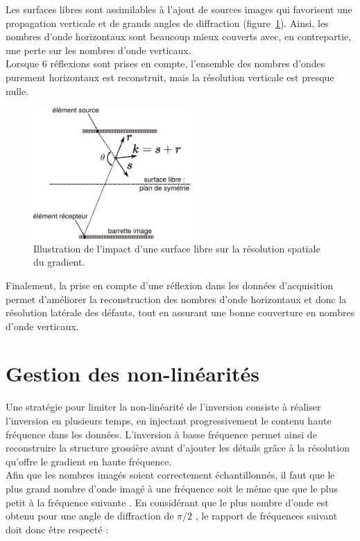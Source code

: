 Les surfaces libres sont assimilables à l'ajout de sources images qui favorisent une propagation verticale et de grands angles de diffraction (figure~\ref{app:reso_surf_libre}). Ainsi, les nombres d'onde horizontaux sont beaucoup mieux couverts avec, en contrepartie, une perte sur les nombres d'onde verticaux.  \\
Lorsque 6 réflexions sont prises en compte, l'ensemble des nombres d'ondes purement horizontaux est reconstruit, mais la résolution verticale est presque nulle.
\begin{figure}[!h]
	\centering
	\includegraphics[height=5cm]{img/reso_surf_libre.png}
	\caption{Illustration de l'impact d'une surface libre sur la résolution spatiale du gradient.\label{app:reso_surf_libre}}
\end{figure}



Finalement, la prise en compte d'une réflexion dans les données d'acquisition permet d'améliorer la reconstruction des nombres d'onde horizontaux et donc la résolution latérale des défauts, tout en assurant une bonne couverture en nombres d'onde verticaux.


\section{Gestion des non-linéarités}
Une stratégie pour limiter la non-linéarité de l'inversion consiste à réaliser l'inversion en plusieurs temps, en injectant progressivement le contenu haute fréquence dans les données. L'inversion à basse fréquence permet ainsi de reconstruire la structure grossière avant d'ajouter les détails grâce à la résolution qu'offre le gradient en haute fréquence.\\



Afin que les nombres imagés soient correctement échantillonnés, il faut que le plus grand nombre d'onde imagé à une fréquence soit le même que que le plus petit à la fréquence suivante \citep{sirgue}. En considérant que le plus nombre d'onde est obtenu pour une angle de diffraction de $\pi/2$ , le rapport de fréquences suivant doit donc être respecté : 

